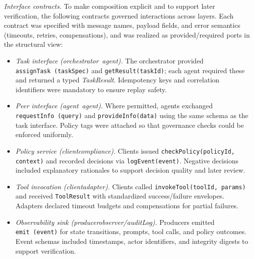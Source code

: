 \emph{Interface contracts.} To make composition explicit and to support later verification, the following contracts governed interactions across layers. Each contract was specified with message names, payload fields, and error semantics (timeouts, retries, compensations), and was realized as provided/required ports in the structural view:
\begin{itemize}
  \item \emph{Task interface (orchestrator\textendash~agent).} The orchestrator provided \texttt{assignTask\ (taskSpec)} and \texttt{getResult(taskId)}; each agent required these and returned a typed \emph{TaskResult}. Idempotency keys and correlation identifiers were mandatory to ensure replay safety.
  \item \emph{Peer interface (agent\textendash~agent).} Where permitted, agents exchanged \texttt{requestInfo\ (query)} and \texttt{provideInfo(data)} using the same schema as the task interface. Policy tags were attached so that governance checks could be enforced uniformly.
  \item \emph{Policy service (client\textendash compliance).} Clients issued \texttt{checkPolicy(policyId, context)} and recorded decisions via \texttt{logEvent(event)}. Negative decisions included explanatory rationales to support decision quality and later review.
  \item \emph{Tool invocation (client\textendash adapter).} Clients called \texttt{invokeTool(toolId, params)} and received \texttt{ToolResult} with standardized success/failure envelopes. Adapters declared timeout budgets and compensations for partial failures.
  \item \emph{Observability sink (producer\textendash observer/auditLog).} Producers emitted \texttt{emit\ (event)} for state transitions, prompts, tool calls, and policy outcomes. Event schemas included timestamps, actor identifiers, and integrity digests to support verification.
\end{itemize}

